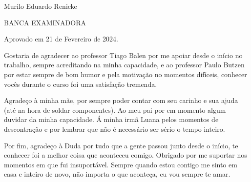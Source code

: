 \begin{folhadeaprovacao}
	\begin{center}
		{\ABNTEXchapterfont\large{Murilo Eduardo Renicke}}
		
		\vspace*{\fill}
		\begin{center}
			\ABNTEXchapterfont\bfseries\Large\imprimirtitulo
		\end{center}
		
		\vspace*{\fill}
		\hspace{.45\textwidth}
		\begin{minipage}{.5\textwidth}
			\imprimirpreambulo
		\end{minipage}%
	\end{center}
	

%	
%   
%	
  \begin{center}
	BANCA EXAMINADORA
	
	
	
   \end{center}
  
 \begin{center}
	Aprovado em 21 de Fevereiro de 2024.
	\end{center}
\end{folhadeaprovacao}

\begin{agradecimentos}
Gostaria de agradecer ao professor Tiago Balen por me apoiar desde o início no trabalho, sempre acreditando na minha capacidade, e ao professor Paulo Butzen por estar sempre de bom humor e pela motivação no momentos difíceis, conhecer vocês durante o curso foi uma satisfação tremenda.

Agradeço à minha mãe, por sempre poder contar com seu carinho e sua ajuda (até na hora de soldar componentes). Ao meu pai por em momento algum duvidar da minha capacidade. Á minha irmã Luana pelos momentos de descontração e por lembrar que não é necessário ser sério o tempo inteiro.

Por fim, agradeço à Duda por tudo que a gente passou junto desde o início, te conhecer foi a melhor coisa que aconteceu comigo. Obrigado por me suportar nos momentos em que fui insuportável. Sempre quando estou contigo me sinto em casa e inteiro de novo, não importa o que aconteça, eu vou sempre te amar.

\end{agradecimentos}


